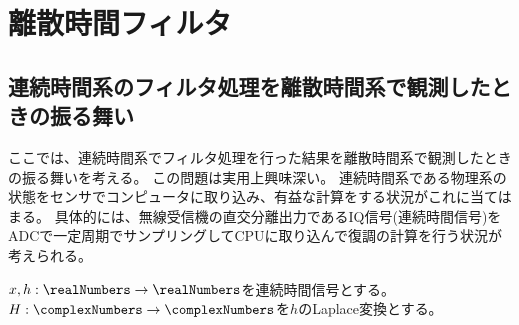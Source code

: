 \chapter{離散時間フィルタ}
    \section{連続時間系のフィルタ処理を離散時間系で観測したときの振る舞い}
        ここでは、連続時間系でフィルタ処理を行った結果を離散時間系で観測したときの振る舞いを考える。
        この問題は実用上興味深い。
        連続時間系である物理系の状態をセンサでコンピュータに取り込み、有益な計算をする状況がこれに当てはまる。
        具体的には、無線受信機の直交分離出力であるIQ信号(連続時間信号)をADCで一定周期でサンプリングしてCPUに取り込んで復調の計算を行う状況が考えられる。
        \begin{shadebox}
            $x,h:\realNumbers\to\realNumbers$を連続時間信号とする。
            $H:\complexNumbers\to\complexNumbers$を$h$のLaplace変換とする。
        \end{shadebox}